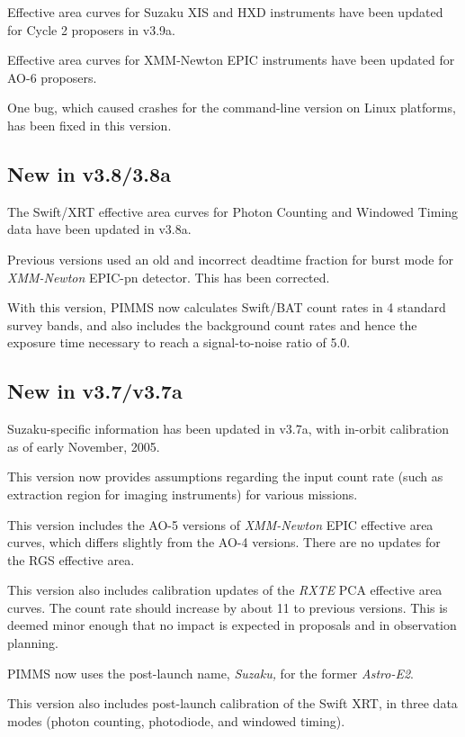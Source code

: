 \documentclass[11pt]{article}
\begin{document}
\begin{appendices}
Effective area curves for Suzaku XIS and HXD instruments have been
updated for Cycle 2 proposers in v3.9a.

Effective area curves for XMM-Newton EPIC instruments have been
updated for AO-6 proposers.

One bug, which caused crashes for the command-line version on Linux
platforms, has been fixed in this version.

\subsection{New in v3.8/3.8a}

The Swift/XRT effective area curves for Photon Counting and Windowed Timing
data have been updated in v3.8a.

Previous versions used an old and incorrect deadtime fraction for burst
mode for {\sl XMM-Newton\/} EPIC-pn detector.  This has been corrected.

With this version, PIMMS now calculates Swift/BAT count rates in 4 standard
survey bands, and also includes the background count rates and hence the
exposure time necessary to reach a signal-to-noise ratio of 5.0.

\subsection{New in v3.7/v3.7a}

Suzaku-specific information has been updated in v3.7a, with in-orbit
calibration as of early November, 2005.

This version now provides assumptions regarding the input count rate
(such as extraction region for imaging instruments) for various missions.

This version includes the AO-5 versions of {\sl XMM-Newton\/} EPIC effective area
curves, which differs slightly from the AO-4 versions.  There are no updates
for the RGS effective area.

This version also includes calibration updates of the {\sl RXTE\/} PCA
effective area curves.  The count rate should increase by about 11%
to previous versions.  This is deemed minor enough that no impact is expected
in proposals and in observation planning.

PIMMS now uses the post-launch name, {\em Suzaku,\/}
for the former {\em Astro-E2\/}.

This version also includes post-launch calibration of the Swift XRT,
in three data modes (photon counting, photodiode, and windowed timing).


\end{appendices}
\end{document}
